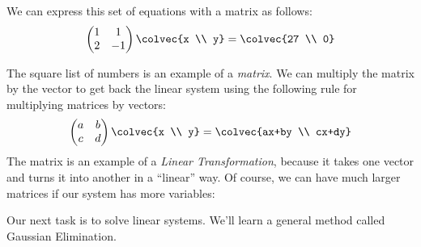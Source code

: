 We can express this set of equations with a matrix as follows:
\begin{equation*}
    \begin{pmatrix}
      1             &1  \\
      2             &-1
    \end{pmatrix}
  \colvec{x \\ y}
  =
  \colvec{27 \\ 0}
\end{equation*}

The square list of numbers is an example of a \emph{matrix}.  We can multiply the matrix by the vector to get back the linear system using the following rule for multiplying matrices by vectors:
\begin{equation}\label{2x2multiplication}
    \begin{pmatrix}
      a             &b  \\
      c             &d
    \end{pmatrix}
  \colvec{x \\ y}
  =
  \colvec{ax+by \\ cx+dy}
\end{equation}
\noindent
The matrix is an example of a \emph{Linear Transformation}, because it takes one vector and turns it into another in a ``linear'' way.
Of course, we can have much larger matrices if our system has more variables:



Our next task is to solve linear systems. We'll learn a general method called Gaussian Elimination.








\newpage
